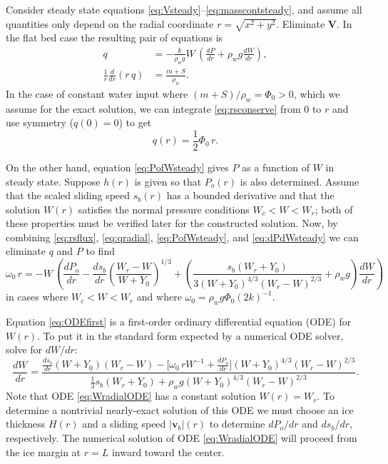 \documentclass[11pt,final]{amsart}
\newcommand\bv{\mathbf{v}}
\newcommand\bV{\mathbf{V}}
\begin{document}
Consider steady state equations \eqref{eq:Vsteady}--\eqref{eq:masscontsteady}, and assume all quantities only depend on the radial coordinate $r = \sqrt{x^2+y^2}$.  Eliminate $\bV$.  In the flat bed case the resulting pair of equations is
\begin{align}
q &= - \frac{k}{\rho_w g} W\, \left(\frac{dP}{dr} + \rho_w g \frac{dW}{dr}\right), \label{eq:rsflux} \\
\frac{1}{r}\frac{d}{dr}\left(r\,q\right) &= \frac{m+S}{\rho_w}. \label{eq:rsconserve}
\end{align}
In the case of constant water input where $(m+S)/\rho_w=\Phi_0 > 0$, which we assume for the exact solution, we can integrate \eqref{eq:rsconserve} from $0$ to $r$ and use symmetry ($q(0)=0$) to get
\begin{equation}
q(r) = \frac{1}{2} \Phi_0\, r. \label{eq:qradial}
\end{equation}

On the other hand, equation \eqref{eq:PofWsteady} gives $P$ as a function of $W$ in steady state.  Suppose $h(r)$ is given so that $P_o(r)$ is also determined.  Assume that the scaled sliding speed $s_b(r)$ has a bounded derivative and that the solution $W(r)$ satisfies the normal pressure conditions $W_c < W < W_r$; both of these properties must be verified later for the constructed solution.  Now, by combining \eqref{eq:rsflux}, \eqref{eq:qradial}, \eqref{eq:PofWsteady}, and \eqref{eq:dPdWsteady} we can eliminate $q$ and $P$ to find
\begin{equation}
\omega_0\, r = - W\, \left(\frac{dP_o}{dr} - \frac{ds_b}{dr} \left(\frac{W_r - W}{W+Y_0}\right)^{1/3} + \left(\frac{s_b (W_r + Y_0)}{3 (W+Y_0)^{4/3} (W_r - W)^{2/3}} + \rho_w g\right) \frac{dW}{dr}\right)  \label{eq:ODEfirst}
\end{equation}
in cases where $W_c < W < W_r$ and where $\omega_0 = \rho_w g \Phi_0 (2 k)^{-1}$. 

Equation \eqref{eq:ODEfirst} is a first-order ordinary differential equation (ODE) for $W(r)$.  To put it in the standard form expected by a numerical ODE solver, solve for $dW/dr$:
\begin{equation}
\frac{dW}{dr} = \frac{\frac{ds_b}{dr} (W+Y_0) (W_r - W) - \Big[\omega_0\, r W^{-1} + \frac{dP_o}{dr}\Big] (W + Y_0)^{4/3} \left(W_r - W\right)^{2/3}}{\frac{1}{3} s_b (W_r + Y_0) + \rho_w g (W + Y_0)^{4/3} (W_r - W)^{2/3}}.
\label{eq:WradialODE}
\end{equation}
Note that ODE \eqref{eq:WradialODE} has a constant solution $W(r)=W_r$.  To determine a nontrivial nearly-exact solution of this ODE we must choose an ice thickness $H(r)$ and a sliding speed $|\bv_b|(r)$ to determine $dP_o/dr$ and $ds_b/dr$, respectively.  The numerical solution of ODE \eqref{eq:WradialODE} will proceed from the ice margin at $r=L$ inward toward the center.
\end{document}

